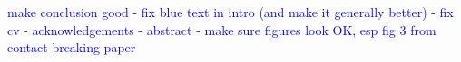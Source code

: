 \documentclass[dissertation, copyright, numbers, sort&compress, notables]{uothesis}
\newcommand{\jamesemph}[1]
{\textcolor{blue}{#1}}
\begin{document}
\maketitle

\jamesemph{
make conclusion good - 
fix blue text in intro (and make it generally better) -
fix cv -
acknowledgements - 
abstract - 
make sure figures look OK, esp fig 3 from contact breaking paper
}











\end{document}
